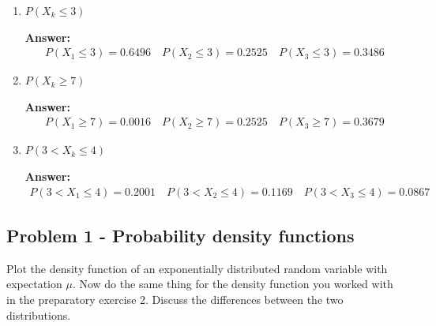 \documentclass[letterpaper,12pt]{article}
\begin{document}
\begin{enumerate}
    \item $P(X_{k} \leq 3)$
    \begin{tcolorbox}
    \textbf{Answer:}
    \begin{gather*}
        P(X_{1} \leq 3) = 0.6496 \quad
        P(X_{2} \leq 3) = 0.2525 \quad
        P(X_{3} \leq 3) = 0.3486
    \end{gather*}
    \end{tcolorbox}
    
    \item $P(X_{k} \geq 7)$
    \begin{tcolorbox}
    \textbf{Answer:}
    \begin{gather*}
        P(X_{1} \geq 7) = 0.0016 \quad
        P(X_{2} \geq 7) = 0.2525 \quad
        P(X_{3} \geq 7) = 0.3679
    \end{gather*}
    \end{tcolorbox}
    
    \item $P(3 < X_{k} \leq 4)$
    \begin{tcolorbox}
    \textbf{Answer:}
    \begin{gather*}
        P(3 < X_{1} \leq 4) = 0.2001 \quad
        P(3 < X_{2} \leq 4) = 0.1169 \quad
        P(3 < X_{3} \leq 4) = 0.0867
    \end{gather*}
    \end{tcolorbox}
\end{enumerate}

\subsection*{Problem 1 - Probability density functions}
Plot the density function of an exponentially distributed random variable
with expectation $\mu$. Now do the same thing for the density function you worked with in the preparatory exercise 2. Discuss the differences between the two distributions.
\end{document}
